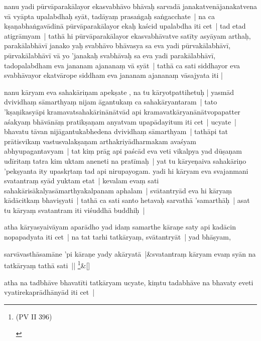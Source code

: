 \documentclass[article,a4paper]{memoir}
\begin{document}
	  \pstart nanu yadi pū\-rvā\-parakā\-layor ekasvabhā\-vo bhā\-vaḥ sarvadā\- janakatvenā\-janakatvena vā\- vyā\-pta upalabdhaḥ syā\-t, tadā\-yaṃ prasaṅgaḥ saṅgacchate | na ca kṣaṇabhaṅgavā\-dinā\- pū\-rvā\-parakā\-layor ekaḥ kaścid upalabdha iti cet | \label{thakur75-76.1} tad etad atigrā\-myam | tathā\- hi pū\-rvā\-parakā\-layor ekasvabhā\-vatve satī\-ty asyā\-yam arthaḥ, parakā\-labhā\-vī\- janako yaḥ svabhā\-vo bhā\-vasya sa eva yadi pū\-rvakā\-labhā\-vī\-, pū\-rvakā\-labhā\-vī\- vā\- yo 'janakaḥ svabhā\-vaḥ sa eva yadi parakā\-labhā\-vī\-, tadopalabdham eva jananam ajananaṃ vā\- syā\-t | tathā\- ca sati siddhayor eva svabhā\-vayor ekatvā\-rope siddham eva jananam ajananaṃ vā\-sajyata iti |
	\pend
      

	  \pstart nanu kā\-ryam eva sahakā\-riṇam apekṣate , na tu kā\-ryotpattihetuḥ | yasmā\-d dvividhaṃ sā\-marthyaṃ nijam ā\-gantukaṃ ca sahakā\-ryantaram | tato 'kṣaṇikasyā\-pi kramavatsahakā\-rinā\-nā\-tvā\-d api kramavatkā\-ryanā\-nā\-tvopapatter aśakyaṃ bhā\-vā\-nā\-ṃ pratikṣaṇam anyatvam upapā\-dayitum iti cet | \label{thakur75-76.9} ucyate | bhavatu tā\-van nijā\-gantukabhedena dvividhaṃ sā\-marthyam | tathā\-pi tat prā\-tisvikaṃ vastusvalakṣaṇam arthakriyā\-dharmakam avaśyam abhyupagantavyam | tat kiṃ prā\-g api paścā\-d eva veti vikalpya yad dū\-ṣaṇam udī\-ritaṃ tatra kim uktam aneneti na pratī\-maḥ | \label{thakur75-76.12} yat tu kā\-ryeṇaiva sahakā\-riṇo 'pekṣyanta ity upaskṛtaṃ tad api nirupayogam. yadi hi kā\-ryam eva svajanmani svatantraṃ syā\-d yuktam etat | kevalam evaṃ sati sahakā\-risā\-kalyasā\-marthyakalpanam aphalam | svā\-tantryā\-d eva hi kā\-ryaṃ kā\-dā\-citkaṃ bhaviṣyati | tathā\- ca sati santo hetavaḥ sarvathā\- 'samarthā\-ḥ | asat tu kā\-ryaṃ svatantram iti viśuddhā\- buddhiḥ |
	\pend
      

	  \pstart atha kā\-ryasyaivā\-yam aparā\-dho yad idaṃ samarthe kā\-raṇe saty api kadā\-cin nopapadyata iti cet | na tat tarhi tatkā\-ryaṃ, svā\-tantryā\-t | \label{thakur75-76.18} yad bhā\-ṣyam,
	\pend
      
	    
	    \stanza[\smallbreak]
sarvā\-vasthā\-samā\-ne 'pi kā\-raṇe yady akā\-ryatā\- |&svatantraṃ kā\-ryam evaṃ syā\-n na tatkā\-ryaṃ tathā\- sati || \footnote{\begin{english}(PV II 396)\end{english}}\&[\smallbreak]


	

	  \pstart atha na tadbhā\-ve bhavatī\-ti tatkā\-ryam ucyate, kiṃtu tadabhā\-ve na bhavaty eveti vyatirekaprā\-dhā\-nyā\-d iti cet |
	\pend
      
\end{document}
